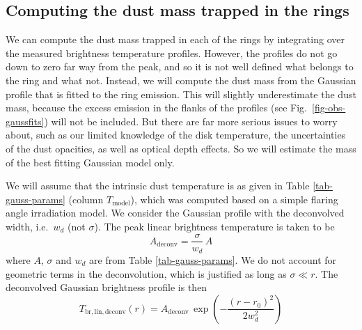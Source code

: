 \documentclass{aa}
\begin{document}
\subsection{Computing the dust mass trapped in the rings}
\label{sec-computing-dust-mass}
%
We can compute the dust mass trapped in each of the rings by integrating over
the measured brightness temperature profiles. However, the profiles do not go
down to zero far way from the peak, and so it is not well defined what belongs
to the ring and what not. Instead, we will compute the dust mass from the
Gaussian profile that is fitted to the ring emission. This will slightly
underestimate the dust mass, because the excess emission in the flanks of the
profiles (see Fig.~\ref{fig-obs-gaussfits}) will not be included. But there are
far more serious issues to worry about, such as our limited knowledge of the
disk temperature, the uncertainties of the dust opacities, as well as optical
depth effects. So we will estimate the mass of the best fitting Gaussian model
only.

We will assume that the intrinsic dust temperature is as given in Table
\ref{tab-gauss-params} (column $T_{\mathrm{model}}$), which was computed based on
a simple flaring angle irradiation model. We consider the Gaussian profile with
the deconvolved width, i.e.\ $w_d$ (not $\sigma$). The peak linear brightness
temperature is taken to be
\begin{equation}
A_{\mathrm{deconv}} = \frac{\sigma}{w_d}\,A
\end{equation}
where $A$, $\sigma$ and $w_d$ are from Table \ref{tab-gauss-params}. We do not
account for geometric terms in the deconvolution, which is justified as long as
$\sigma\ll r$. The deconvolved Gaussian brightness profile is then
\begin{equation}\label{eq-tbrlin-deconvolved}
T_{\mathrm{br,lin,deconv}}(r) = A_{\mathrm{deconv}}\,\exp\left(-\frac{(r-r_0)^2}{2w_d^2}\right)
\end{equation}
\end{document}
